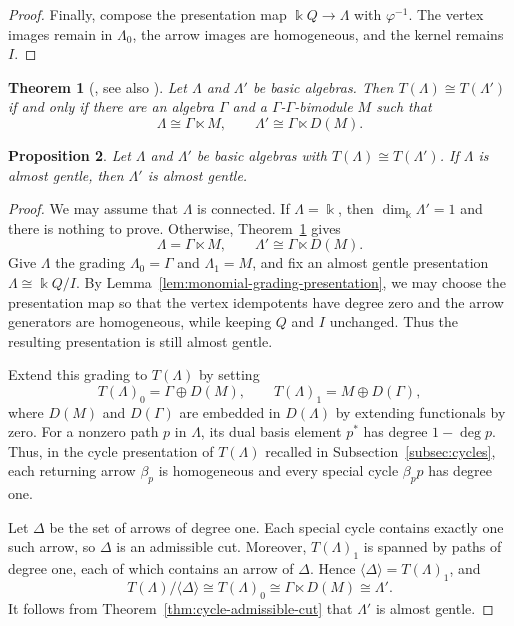 \documentclass[11pt]{article}
\newtheorem{theorem}{Theorem}[section]
\newtheorem{proposition}[theorem]{Proposition}
\theoremstyle{definition}
\begin{document}
\begin{proof}
			Finally, compose the presentation map $\Bbbk Q\to \Lambda$ with $\varphi^{-1}$.
			The vertex images remain in $\Lambda_0$, the arrow images are homogeneous, and the kernel remains $I$.
		\end{proof}

		\begin{theorem}[{\cite{WakamatsuTrivialExtensions}, see also \cite[Theorem~4.1]{FernandezEtAlTrivialExtensions}}]
			\label{thm:wakamatsu-trivial-extensions}
			Let $\Lambda$ and $\Lambda'$ be basic algebras.
			Then $T(\Lambda)\cong T(\Lambda')$ if and only if there are an algebra $\Gamma$ and a $\Gamma$-$\Gamma$-bimodule $M$ such that
			\[
				\Lambda\cong \Gamma\ltimes M,
				\qquad
				\Lambda'\cong \Gamma\ltimes D(M).
			\]
		\end{theorem}


		\begin{proposition}
			\label{prop:almost-gentle-trivial-invariance}
			Let $\Lambda$ and $\Lambda'$ be basic algebras with $T(\Lambda)\cong T(\Lambda')$.
			If $\Lambda$ is almost gentle, then $\Lambda'$ is almost gentle.
		\end{proposition}

		\begin{proof}
			We may assume that $\Lambda$ is connected.
			If $\Lambda=\Bbbk$, then $\dim_\Bbbk \Lambda'=1$ and there is nothing to prove.
			Otherwise, Theorem~\ref{thm:wakamatsu-trivial-extensions} gives
			\[
				\Lambda=\Gamma\ltimes M,\qquad \Lambda'\cong \Gamma\ltimes D(M).
			\]
			Give $\Lambda$ the grading $\Lambda_0=\Gamma$ and $\Lambda_1=M$, and fix an almost gentle presentation $\Lambda\cong\Bbbk Q/I$.
			By Lemma~\ref{lem:monomial-grading-presentation}, we may choose the presentation map so that the vertex idempotents have degree zero and the arrow generators are homogeneous, while keeping $Q$ and $I$ unchanged.
			Thus the resulting presentation is still almost gentle.

			Extend this grading to $T(\Lambda)$ by setting
			\[
				T(\Lambda)_0=\Gamma\oplus D(M),\qquad T(\Lambda)_1=M\oplus D(\Gamma),
			\]
			where $D(M)$ and $D(\Gamma)$ are embedded in $D(\Lambda)$ by extending functionals by zero.
			For a nonzero path $p$ in $\Lambda$, its dual basis element $p^*$ has degree $1-\deg p$.
			Thus, in the cycle presentation of $T(\Lambda)$ recalled in Subsection~\ref{subsec:cycles}, each returning arrow $\beta_p$ is homogeneous and every special cycle $\beta_p p$ has degree one.

			Let $\Delta$ be the set of arrows of degree one.
			Each special cycle contains exactly one such arrow, so $\Delta$ is an admissible cut.
			Moreover, $T(\Lambda)_1$ is spanned by paths of degree one, each of which contains an arrow of $\Delta$.
			Hence $\langle\Delta\rangle=T(\Lambda)_1$, and
			\[
				T(\Lambda)/\langle\Delta\rangle\cong T(\Lambda)_0
				\cong \Gamma\ltimes D(M)\cong \Lambda'.
			\]
			It follows from Theorem~\ref{thm:cycle-admissible-cut} that $\Lambda'$ is almost gentle.
		\end{proof}
\end{document}
